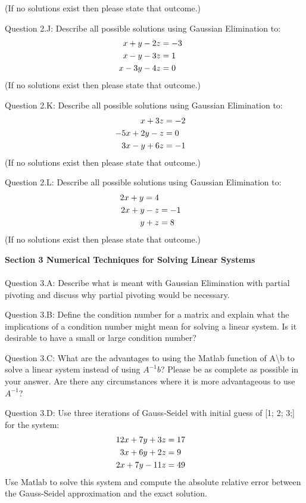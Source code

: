 \documentclass{article}
\def\ds{\displaystyle}
\begin{document}
(If no solutions exist then please state that outcome.) 
\par \medskip \noindent 
%
Question 2.J: Describe all possible solutions using Gaussian Elimination to:
\begin{align*}
     x + y - 2z &= -3 \cr 
    x - y -3z  &= 1 \cr
    x - 3y -4 z  &= 0 
\end{align*}
(If no solutions exist then please state that outcome.) 
\par \medskip \noindent 
%
Question 2.K: Describe all possible solutions using Gaussian Elimination to:
\begin{align*}
     x + 3z &= -2 \cr 
    -5 x + 2y - z  &= 0 \cr
    3x - y + 6z  &= -1 
\end{align*}
(If no solutions exist then please state that outcome.)
\par \medskip \noindent 
Question 2.L: Describe all possible solutions using Gaussian Elimination to:
\begin{align*}
     2x + y = 4 \cr 
    2 x + y - z  &= -1 \cr
    y + z  &= 8 
\end{align*}
(If no solutions exist then please state that outcome.) 
\par \bigskip \noindent 
%
{\bf Section 3 Numerical Techniques for Solving Linear Systems}\\
\\
%
Question 3.A:  Describe what is meant with Gaussian Elimination with partial pivoting and discuss why partial pivoting would be necessary. 
\par \medskip \noindent 
%
Question 3.B:  Define the condition number for a matrix and explain what the implications of a condition number might mean for solving a linear system.  Is it desirable to have a small or large condition number?
\par \medskip \noindent 
%
Question 3.C: What are the advantages to using the Matlab function of A\textbackslash b to solve a linear system instead of using $\ds A^{-1}b$? Please be as complete as possible in your answer. Are there any circumstances where it is more advantageous to use $\ds A^{-1}$?
\par \medskip \noindent 
%
Question 3.D:  Use three iterations of Gauss-Seidel with initial guess of [1; 2; 3;] for the system:
\begin{align*}
    12x + 7y + 3z &= 17 \cr 
    3x + 6y + 2z  &= 9 \cr
    2x + 7y - 11z &= 49
\end{align*}
Use Matlab to solve this system and compute the absolute relative error between the Gauss-Seidel approximation and the exact solution. 
\end{document}
